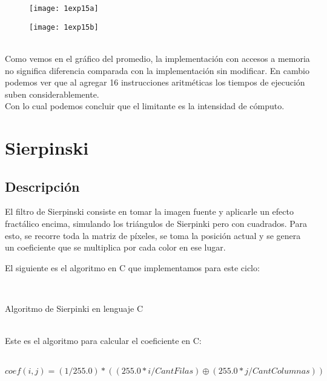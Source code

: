 ﻿\documentclass[a4paper]{article}
\begin{document}
\begin{figure}[h]
  \centering
    \texttt{[image: 1exp15a]}
\end{figure}

\begin{figure}[h]
  \centering
    \texttt{[image: 1exp15b]}
\end{figure}

\ \\
Como vemos en el gráfico del promedio, la implementación con accesos a memoria no significa diferencia comparada con la implementación sin modificar.
En cambio podemos ver que al agregar 16 instrucciones aritméticas los tiempos de ejecución suben considerablemente.\\
Con lo cual podemos concluir que el limitante es la intensidad de cómputo.


\section{Sierpinski}
\subsection{Descripci\'on}

El filtro de Sierpinski consiste en tomar la imagen fuente y aplicarle un efecto fract\'alico encima, simulando los tri\'angulos de Sierpinki pero con cuadrados. Para esto, se recorre toda la matriz de píxeles, se toma la posici\'on actual y se genera un coeficiente que se multiplica por cada color en ese lugar. 

El siguiente es el algoritmo en C que implementamos para este ciclo:
\ \\
\begin{algorithm}[H]
\ \\
\caption{Algoritmo de Sierpinki en lenguaje C}
\end{algorithm}	
\ \\
Este es el algoritmo para calcular el coeficiente en C:\\
\ \\
\begin{algorithm}[H]
$ coef(i,j)=(1/255.0)*((255.0*i/CantFilas)\oplus(255.0*j/CantColumnas)) $

\end{algorithm}
 
\end{document}
